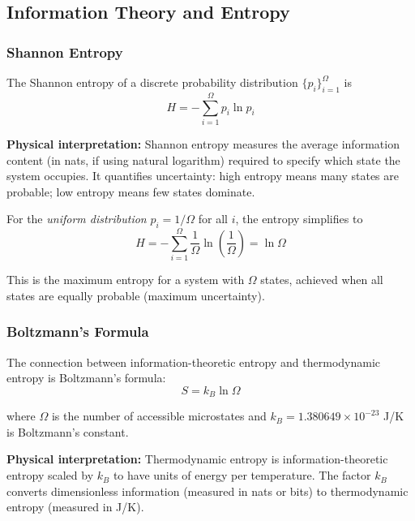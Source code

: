 \documentclass[twocolumn,10pt]{article}
\theoremstyle{remark}
\begin{document}
\subsection{Information Theory and Entropy}

\subsubsection{Shannon Entropy}

The Shannon entropy of a discrete probability distribution $\{p_i\}_{i=1}^{\Omega}$ is \cite{shannon1948}
\begin{equation}
    H = -\sum_{i=1}^{\Omega} p_i \ln p_i
    \label{eq:shannon_entropy}
\end{equation}

\textbf{Physical interpretation:} Shannon entropy measures the average information content (in nats, if using natural logarithm) required to specify which state the system occupies. It quantifies uncertainty: high entropy means many states are probable; low entropy means few states dominate.

For the \textit{uniform distribution} $p_i = 1/\Omega$ for all $i$, the entropy simplifies to
\begin{equation}
    H = -\sum_{i=1}^{\Omega} \frac{1}{\Omega} \ln\left(\frac{1}{\Omega}\right) = \ln \Omega
    \label{eq:shannon_uniform}
\end{equation}

This is the maximum entropy for a system with $\Omega$ states, achieved when all states are equally probable (maximum uncertainty).

\subsubsection{Boltzmann's Formula}

The connection between information-theoretic entropy and thermodynamic entropy is Boltzmann's formula:
\begin{equation}
    S = k_B \ln \Omega
    \label{eq:boltzmann_formula}
\end{equation}

where $\Omega$ is the number of accessible microstates and $k_B = 1.380649 \times 10^{-23}$ J/K is Boltzmann's constant.

\textbf{Physical interpretation:} Thermodynamic entropy is information-theoretic entropy scaled by $k_B$ to have units of energy per temperature. The factor $k_B$ converts dimensionless information (measured in nats or bits) to thermodynamic entropy (measured in J/K).
\end{document}
